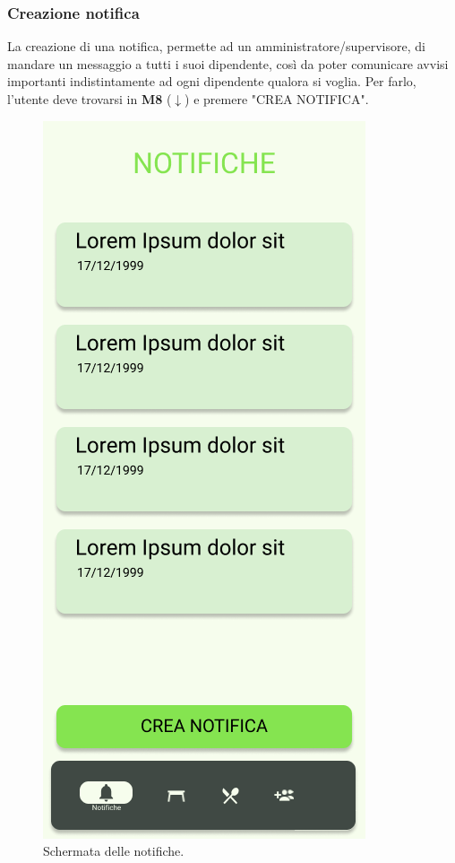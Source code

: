 \subsubsection{Creazione notifica}
La creazione di una notifica, permette ad un amministratore/supervisore, di mandare un messaggio a tutti i suoi dipendente, così da poter comunicare avvisi importanti indistintamente ad ogni dipendente qualora si voglia. Per farlo, l'utente deve trovarsi in \textbf{M8} ($\downarrow$) e premere "CREA NOTIFICA".
\begin{figure}[H]
  \centering
  \includegraphics[scale=0.6]{img/mock-up/Notificaitons.png}
  \caption{Schermata delle notifiche.}
\end{figure}
